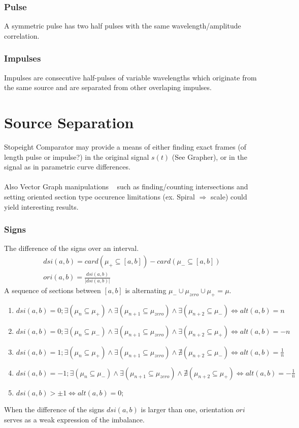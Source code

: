 \documentclass{report}
\begin{document}
\subsection{Pulse}
A symmetric pulse has two half pulses with the same wavelength/amplitude correlation.

\subsection{Impulses}
Impulses are consecutive half-pulses of variable wavelengths which originate from the same source and are separated from other overlaping impulses.

\chapter{Source Separation}
Stopeight Comparator may provide a means of either finding exact frames (of length pulse or impulse?) in the original signal $s(t)$ (See Grapher), or in the signal as in parametric curve differences.\\\\
Also Vector Graph manipulations ~\cite{Analyzer} such as finding/counting intersections and setting oriented section type occurence limitations (ex. Spiral $\Rightarrow$ scale) could yield interesting results.

\subsection{Signs}
The difference of the signs over an interval.
\begin{align}
dsi(a,b) = card(\mu_{+}\subseteq [a,b])-card(\mu_{-} \subseteq [a,b])\\
ori(a,b) = \frac{dsi(a,b)}{\lvert dsi(a,b) \rvert}
\end{align}
A sequence of sections between $[a,b]$ is alternating $\mu_{-}\cup \mu_{zero}\cup\mu_{+}=\mu$.
\begin{enumerate}
\item $dsi(a,b)= 0; \exists(\mu_{n}\subseteq \mu_{+}) \land \exists(\mu_{n+1}\subseteq \mu_{zero}) \land \exists(\mu_{n+2}\subseteq \mu_{-}) \Leftrightarrow alt(a,b)=n$
\item $dsi(a,b)= 0; \exists(\mu_{n}\subseteq \mu_{-}) \land \exists(\mu_{n+1}\subseteq \mu_{zero}) \land \exists(\mu_{n+2}\subseteq \mu_{+}) \Leftrightarrow alt(a,b)=-n$
\item $dsi(a,b)= 1; \exists(\mu_{n}\subseteq \mu_{+}) \land \exists(\mu_{n+1}\subseteq \mu_{zero}) \land \nexists(\mu_{n+2}\subseteq \mu_{-}) \Leftrightarrow alt(a,b)=\frac{1}{n}$
\item $dsi(a,b)= -1; \exists(\mu_{n}\subseteq \mu_{-}) \land \exists(\mu_{n+1}\subseteq \mu_{zero}) \land \nexists(\mu_{n+2}\subseteq \mu_{+}) \Leftrightarrow alt(a,b)=-\frac{1}{n}$
\item $dsi(a,b)> \pm 1\Leftrightarrow alt(a,b)=0$;
\end{enumerate}
When the difference of the signs $dsi(a,b)$ is larger than one, orientation $ori$ serves as a weak expression of the imbalance.
\end{document}
